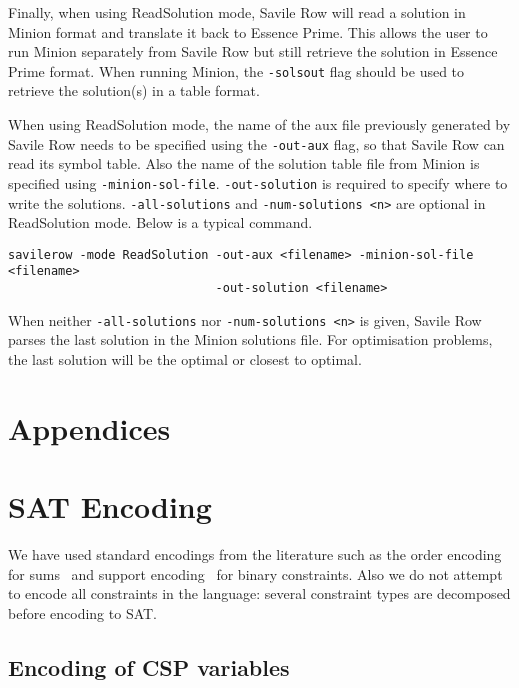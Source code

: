 \documentclass[a4paper]{article}
\newcommand{\eprime}{{\sc Essence Prime}\xspace}
\newcommand{\savilerow}{{\sc Savile Row}\xspace}
\begin{document}
Finally, when using ReadSolution mode, \savilerow will read a solution in Minion
format and translate it back to \eprime. This allows the user to run Minion
separately from \savilerow but still retrieve the solution in \eprime format. 
When running Minion, the \texttt{-solsout} flag should be used to retrieve the
solution(s) in a table format. 

When using ReadSolution mode, the name of the aux file previously 
generated by \savilerow needs to be specified using the \texttt{-out-aux} flag,
so that \savilerow can read its symbol table. Also the name of the solution table file
from Minion is specified using \texttt{-minion-sol-file}. \texttt{-out-solution} 
is required to specify where to write the solutions. \texttt{-all-solutions} and 
\texttt{-num-solutions <n>} are optional in ReadSolution mode. 
Below is a typical command. 

\begin{verbatim}
savilerow -mode ReadSolution -out-aux <filename> -minion-sol-file <filename> 
                             -out-solution <filename>
\end{verbatim}

When neither \texttt{-all-solutions} nor \texttt{-num-solutions <n>} is given,
\savilerow parses the last solution in the Minion solutions file. For optimisation 
problems, the last solution will be the optimal or closest to optimal. 


\appendix

\section*{Appendices}

\section{SAT Encoding} \label{app:satenc}

We have used standard encodings from the literature such as the order encoding for sums~\cite{tamura2009compiling} and support encoding~\cite{gent-encodings-02} for binary constraints. Also we do not attempt to encode all constraints in the language: several constraint types are decomposed before encoding to SAT. 

\subsection{Encoding of CSP variables}
\end{document}
